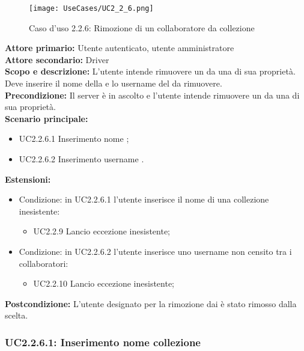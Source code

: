 \documentclass{scalatekids-article}
\begin{document}
\begin{figure}[H]
  \begin{center}
    \texttt{[image: UseCases/UC2\_2\_6.png]}
    \caption*{Caso d'uso 2.2.6: Rimozione di un collaboratore da collezione}
  \end{center}
\end{figure}
\textbf{Attore primario:} Utente autenticato, utente amministratore\\
\textbf{Attore secondario:} Driver\\
\textbf{Scopo e descrizione:} L'utente intende rimuovere un  da una  di sua proprietà. Deve inserire il nome della  e lo username del  da rimuovere.\\
\textbf{Precondizione:} Il server è in ascolto e l'utente intende rimuovere un  da una  di sua proprietà.\\
\textbf{Scenario principale:}
\begin{itemize}
\item UC2.2.6.1 Inserimento nome ;
\item UC2.2.6.2 Inserimento username .
\end{itemize}
\textbf{Estensioni:}
\begin{itemize}
\item Condizione: in UC2.2.6.1 l'utente inserisce il nome di una collezione inesistente:
  \begin{itemize}
  \item UC2.2.9 Lancio eccezione  inesistente;
  \end{itemize}
\item Condizione: in UC2.2.6.2 l'utente inserisce uno username non censito tra i collaboratori:
  \begin{itemize}
  \item UC2.2.10 Lancio eccezione  inesistente;
  \end{itemize}
\end{itemize}
\textbf{Postcondizione:} L'utente designato per la rimozione dai  è stato rimosso dalla  scelta.

\subsubsection{UC2.2.6.1: Inserimento nome collezione}
\end{document}
